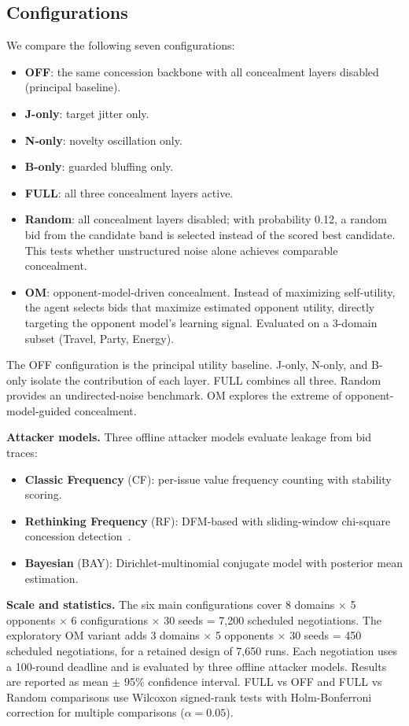 \documentclass[runningheads]{llncs}
\begin{document}
\subsection{Configurations}

We compare the following seven configurations:
\begin{itemize}
    \item \textbf{OFF}: the same concession backbone with all concealment layers disabled (principal baseline).
    \item \textbf{J-only}: target jitter only.
    \item \textbf{N-only}: novelty oscillation only.
    \item \textbf{B-only}: guarded bluffing only.
    \item \textbf{FULL}: all three concealment layers active.
    \item \textbf{Random}: all concealment layers disabled; with probability 0.12, a random bid from the candidate band is selected instead of the scored best candidate. This tests whether unstructured noise alone achieves comparable concealment.
    \item \textbf{OM}: opponent-model-driven concealment. Instead of maximizing self-utility, the agent selects bids that maximize estimated opponent utility, directly targeting the opponent model's learning signal. Evaluated on a 3-domain subset (Travel, Party, Energy).
\end{itemize}

The OFF configuration is the principal utility baseline. J-only, N-only, and B-only isolate the contribution of each layer. FULL combines all three. Random provides an undirected-noise benchmark. OM explores the extreme of opponent-model-guided concealment.

\textbf{Attacker models.} Three offline attacker models evaluate leakage from bid traces:
\begin{itemize}
    \item \textbf{Classic Frequency} (CF): per-issue value frequency counting with stability scoring.
    \item \textbf{Rethinking Frequency} (RF): DFM-based with sliding-window chi-square concession detection~\cite{rethinkfrequency}.
    \item \textbf{Bayesian} (BAY): Dirichlet-multinomial conjugate model with posterior mean estimation.
\end{itemize}

\textbf{Scale and statistics.} The six main configurations cover 8 domains $\times$ 5 opponents $\times$ 6 configurations $\times$ 30 seeds = 7,200 scheduled negotiations. The exploratory OM variant adds 3 domains $\times$ 5 opponents $\times$ 30 seeds = 450 scheduled negotiations, for a retained design of 7,650 runs. Each negotiation uses a 100-round deadline and is evaluated by three offline attacker models. Results are reported as mean $\pm$ 95\% confidence interval. FULL vs OFF and FULL vs Random comparisons use Wilcoxon signed-rank tests with Holm-Bonferroni correction for multiple comparisons ($\alpha = 0.05$). %
\end{document}
